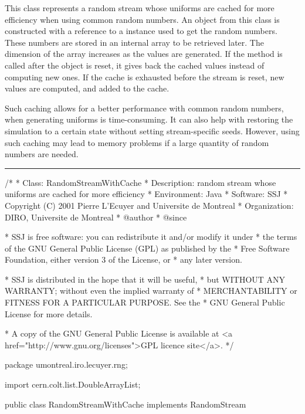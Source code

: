 
This class represents a random stream whose uniforms
are cached for more efficiency when using
common random numbers.  An object
from this class is constructed with a reference to a
 instance used to
get the random numbers.  These numbers
are stored in an internal array to be retrieved later.
The dimension of the array increases as the values
are generated.
If the  method is called after
the object is reset, it gives back the cached
values instead of computing new ones.
If the cache is exhausted before the stream is reset,
new values are computed, and added to the cache.

Such caching allows for a better performance with
common random numbers, when
generating uniforms is time-consuming.
It can also help with restoring the simulation to a
certain state without setting stream-specific
seeds.
However, using such caching may lead to memory problems if
a large quantity of random numbers are needed.

\bigskip\hrule

\begin{code}
\begin{hide}
/*
 * Class:        RandomStreamWithCache
 * Description:  random stream whose uniforms are cached for more efficiency
 * Environment:  Java
 * Software:     SSJ 
 * Copyright (C) 2001  Pierre L'Ecuyer and Universite de Montreal
 * Organization: DIRO, Universite de Montreal
 * @author       
 * @since

 * SSJ is free software: you can redistribute it and/or modify it under
 * the terms of the GNU General Public License (GPL) as published by the
 * Free Software Foundation, either version 3 of the License, or
 * any later version.

 * SSJ is distributed in the hope that it will be useful,
 * but WITHOUT ANY WARRANTY; without even the implied warranty of
 * MERCHANTABILITY or FITNESS FOR A PARTICULAR PURPOSE.  See the
 * GNU General Public License for more details.

 * A copy of the GNU General Public License is available at
   <a href="http://www.gnu.org/licenses">GPL licence site</a>.
 */
\end{hide}
package umontreal.iro.lecuyer.rng;\begin{hide}

import cern.colt.list.DoubleArrayList;
\end{hide}

public class RandomStreamWithCache implements RandomStream\begin{hide} {
   private RandomStream stream;
   private DoubleArrayList values;
   private int index = 0;
   private boolean caching = true;
\end{hide}
\end{code}

